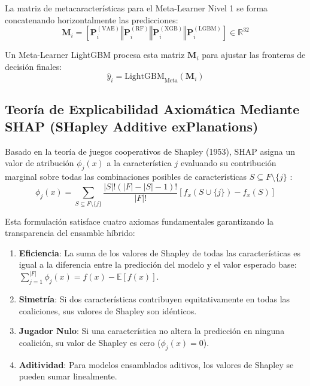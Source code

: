 La matriz de metacaracterísticas para el Meta-Learner Nivel 1 se forma concatenando horizontalmente las predicciones:
\begin{equation}
\mathbf{M}_i = \left[ \mathbf{P}_i^{(\text{VAE})} \mathbin{\Vert} \mathbf{P}_i^{(\text{RF})} \mathbin{\Vert} \mathbf{P}_i^{(\text{XGB})} \mathbin{\Vert} \mathbf{P}_i^{(\text{LGBM})} \right] \in \mathbb{R}^{32}
\end{equation}

Un Meta-Learner LightGBM procesa esta matriz $\mathbf{M}_i$ para ajustar las fronteras de decisión finales:
\begin{equation}
\hat{y}_i = \text{LightGBM}_{\text{Meta}}(\mathbf{M}_i)
\end{equation}

\subsection{Teoría de Explicabilidad Axiomática Mediante SHAP (SHapley Additive exPlanations)}

Basado en la teoría de juegos cooperativos de Shapley (1953), SHAP asigna un valor de atribución $\phi_j(x)$ a la característica $j$ evaluando su contribución marginal sobre todas las combinaciones posibles de características $S \subseteq F \setminus \{j\}$ \citep{lundberg2017unified}:
\begin{equation}
\phi_j(x) = \sum_{S \subseteq F \setminus \{j\}} \frac{|S|!(|F| - |S| - 1)!}{|F|!} \left[ f_x(S \cup \{j\}) - f_x(S) \right]
\end{equation}

Esta formulación satisface cuatro axiomas fundamentales garantizando la transparencia del ensamble híbrido:
\begin{enumerate}
    \item \textbf{Eficiencia}: La suma de los valores de Shapley de todas las características es igual a la diferencia entre la predicción del modelo y el valor esperado base: $\sum_{j=1}^{|F|} \phi_j(x) = f(x) - \mathbb{E}[f(x)]$.
    \item \textbf{Simetría}: Si dos características contribuyen equitativamente en todas las coaliciones, sus valores de Shapley son idénticos.
    \item \textbf{Jugador Nulo}: Si una característica no altera la predicción en ninguna coalición, su valor de Shapley es cero ($\phi_j(x) = 0$).
    \item \textbf{Aditividad}: Para modelos ensamblados aditivos, los valores de Shapley se pueden sumar linealmente.
\end{enumerate}
